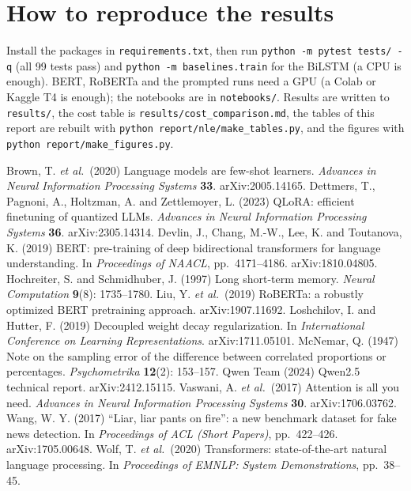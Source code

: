 \documentclass{nle}
\begin{document}
\section{How to reproduce the results}
Install the packages in \texttt{requirements.txt}, then run \texttt{python -m pytest tests/ -q} (all 99 tests pass) and
\texttt{python -m baselines.train} for the BiLSTM (a CPU is enough). BERT, RoBERTa and the prompted runs need a GPU (a
Colab or Kaggle T4 is enough); the notebooks are in \texttt{notebooks/}. Results are written to \texttt{results/}, the
cost table is \texttt{results/cost\_comparison.md}, the tables of this report are rebuilt with
\texttt{python report/nle/make\_tables.py}, and the figures with \texttt{python report/make\_figures.py}.

\label{lastpage}

\begin{thebibliography}{}
 Brown, T. {\it et al.}\ (2020) Language models are few-shot learners. {\it Advances in Neural Information
 Processing Systems\/} {\bf 33}. arXiv:2005.14165.
 Dettmers, T., Pagnoni, A., Holtzman, A. and Zettlemoyer, L. (2023) QLoRA: efficient finetuning of quantized LLMs.
 {\it Advances in Neural Information Processing Systems\/} {\bf 36}. arXiv:2305.14314.
 Devlin, J., Chang, M.-W., Lee, K. and Toutanova, K. (2019) BERT: pre-training of deep bidirectional transformers
 for language understanding. In {\it Proceedings of NAACL}, pp.~4171--4186. arXiv:1810.04805.
 Hochreiter, S. and Schmidhuber, J. (1997) Long short-term memory. {\it Neural Computation\/} {\bf 9}(8): 1735--1780.
 Liu, Y. {\it et al.}\ (2019) RoBERTa: a robustly optimized BERT pretraining approach. arXiv:1907.11692.
 Loshchilov, I. and Hutter, F. (2019) Decoupled weight decay regularization. In {\it International Conference on
 Learning Representations}. arXiv:1711.05101.
 McNemar, Q. (1947) Note on the sampling error of the difference between correlated proportions or percentages.
 {\it Psychometrika\/} {\bf 12}(2): 153--157.
 Qwen Team (2024) Qwen2.5 technical report. arXiv:2412.15115.
 Vaswani, A. {\it et al.}\ (2017) Attention is all you need. {\it Advances in Neural Information Processing
 Systems\/} {\bf 30}. arXiv:1706.03762.
 Wang, W. Y. (2017) ``Liar, liar pants on fire'': a new benchmark dataset for fake news detection. In {\it
 Proceedings of ACL (Short Papers)}, pp.~422--426. arXiv:1705.00648.
 Wolf, T. {\it et al.}\ (2020) Transformers: state-of-the-art natural language processing. In {\it Proceedings of
 EMNLP: System Demonstrations}, pp.~38--45.
\end{thebibliography}
\end{document}
